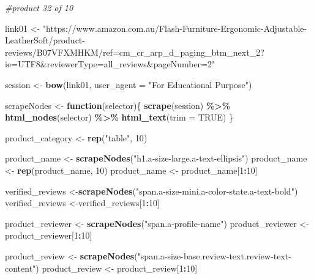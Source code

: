 \documentclass[
]{article}
\newenvironment{Shaded}{\begin{snugshade}}{\end{snugshade}}
\newcommand{\AttributeTok}[1]{\textcolor[rgb]{0.13,0.29,0.53}{#1}}
\newcommand{\CommentTok}[1]{\textcolor[rgb]{0.56,0.35,0.01}{\textit{#1}}}
\newcommand{\ConstantTok}[1]{\textcolor[rgb]{0.56,0.35,0.01}{#1}}
\newcommand{\ControlFlowTok}[1]{\textcolor[rgb]{0.13,0.29,0.53}{\textbf{#1}}}
\newcommand{\DecValTok}[1]{\textcolor[rgb]{0.00,0.00,0.81}{#1}}
\newcommand{\FunctionTok}[1]{\textcolor[rgb]{0.13,0.29,0.53}{\textbf{#1}}}
\newcommand{\NormalTok}[1]{#1}
\newcommand{\OtherTok}[1]{\textcolor[rgb]{0.56,0.35,0.01}{#1}}
\newcommand{\SpecialCharTok}[1]{\textcolor[rgb]{0.81,0.36,0.00}{\textbf{#1}}}
\newcommand{\StringTok}[1]{\textcolor[rgb]{0.31,0.60,0.02}{#1}}
\begin{document}
\begin{Shaded}
\begin{Highlighting}[]
\CommentTok{\#product 32 of 10}

\NormalTok{link01 }\OtherTok{\textless{}{-}} \StringTok{"https://www.amazon.com.au/Flash{-}Furniture{-}Ergonomic{-}Adjustable{-}LeatherSoft/product{-}reviews/B07VFXMHKM/ref=cm\_cr\_arp\_d\_paging\_btm\_next\_2?ie=UTF8\&reviewerType=all\_reviews\&pageNumber=2"}


\NormalTok{  session }\OtherTok{\textless{}{-}} \FunctionTok{bow}\NormalTok{(link01,}
               \AttributeTok{user\_agent =} \StringTok{"For Educational Purpose"}\NormalTok{)}

\NormalTok{  scrapeNodes }\OtherTok{\textless{}{-}} \ControlFlowTok{function}\NormalTok{(selector)\{}
    \FunctionTok{scrape}\NormalTok{(session) }\SpecialCharTok{\%\textgreater{}\%}
      \FunctionTok{html\_nodes}\NormalTok{(selector) }\SpecialCharTok{\%\textgreater{}\%}
      \FunctionTok{html\_text}\NormalTok{(}\AttributeTok{trim =} \ConstantTok{TRUE}\NormalTok{)}
\NormalTok{  \}}

\NormalTok{  product\_category }\OtherTok{\textless{}{-}} \FunctionTok{rep}\NormalTok{(}\StringTok{"table"}\NormalTok{, }\DecValTok{10}\NormalTok{)}

\NormalTok{  product\_name }\OtherTok{\textless{}{-}} \FunctionTok{scrapeNodes}\NormalTok{(}\StringTok{"h1.a{-}size{-}large.a{-}text{-}ellipsis"}\NormalTok{)}
\NormalTok{  product\_name }\OtherTok{\textless{}{-}} \FunctionTok{rep}\NormalTok{(product\_name, }\DecValTok{10}\NormalTok{)}
\NormalTok{  product\_name }\OtherTok{\textless{}{-}}\NormalTok{ product\_name[}\DecValTok{1}\SpecialCharTok{:}\DecValTok{10}\NormalTok{]}
  
\NormalTok{  verified\_reviews }\OtherTok{\textless{}{-}}\FunctionTok{scrapeNodes}\NormalTok{(}\StringTok{"span.a{-}size{-}mini.a{-}color{-}state.a{-}text{-}bold"}\NormalTok{)}
\NormalTok{  verified\_reviews }\OtherTok{\textless{}{-}}\NormalTok{verified\_reviews[}\DecValTok{1}\SpecialCharTok{:}\DecValTok{10}\NormalTok{]}
  
\NormalTok{  product\_reviewer }\OtherTok{\textless{}{-}} \FunctionTok{scrapeNodes}\NormalTok{(}\StringTok{"span.a{-}profile{-}name"}\NormalTok{)}
\NormalTok{  product\_reviewer }\OtherTok{\textless{}{-}}\NormalTok{ product\_reviewer[}\DecValTok{1}\SpecialCharTok{:}\DecValTok{10}\NormalTok{]}
  
\NormalTok{  product\_review }\OtherTok{\textless{}{-}} \FunctionTok{scrapeNodes}\NormalTok{(}\StringTok{"span.a{-}size{-}base.review{-}text.review{-}text{-}content"}\NormalTok{)}
\NormalTok{  product\_review }\OtherTok{\textless{}{-}}\NormalTok{ product\_review[}\DecValTok{1}\SpecialCharTok{:}\DecValTok{10}\NormalTok{]}
  

\end{Highlighting}
\end{Shaded}
\end{document}
